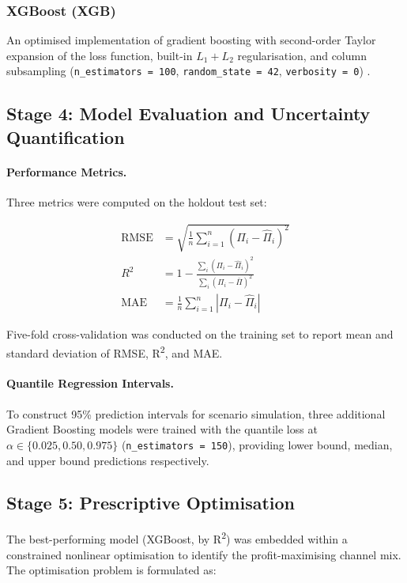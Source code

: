 \documentclass[10pt,a4paper,twocolumn]{article}
\begin{document}
\subsubsection{XGBoost (XGB)}
An optimised implementation of gradient boosting with second-order Taylor expansion of
the loss function, built-in $L_1 + L_2$ regularisation, and column subsampling
(\texttt{n\_estimators = 100}, \texttt{random\_state = 42}, \texttt{verbosity = 0})
\citep{chen2016xgboost}.

\subsection{Stage 4: Model Evaluation and Uncertainty Quantification}
\label{sec:evaluation}

\paragraph{Performance Metrics.}
Three metrics were computed on the holdout test set:

\begin{align}
  \text{RMSE} &= \sqrt{\frac{1}{n}\sum_{i=1}^{n}\left(\Pi_i - \hat{\Pi}_i\right)^2}
  \label{eq:rmse}\\
  R^2 &= 1 - \frac{\sum_{i}(\Pi_i - \hat{\Pi}_i)^2}{\sum_{i}(\Pi_i - \bar{\Pi})^2}
  \label{eq:r2}\\
  \text{MAE} &= \frac{1}{n}\sum_{i=1}^{n}\left|\Pi_i - \hat{\Pi}_i\right|
  \label{eq:mae}
\end{align}

Five-fold cross-validation was conducted on the training set to report mean and
standard deviation of RMSE, R\textsuperscript{2}, and MAE.

\paragraph{Quantile Regression Intervals.}
To construct 95\% prediction intervals for scenario simulation, three additional
Gradient Boosting models were trained with the quantile loss at $\alpha \in
\{0.025, 0.50, 0.975\}$ (\texttt{n\_estimators = 150}), providing lower bound,
median, and upper bound predictions respectively.

\subsection{Stage 5: Prescriptive Optimisation}
\label{sec:optimisation}

The best-performing model (XGBoost, by R\textsuperscript{2}) was embedded within a
constrained nonlinear optimisation to identify the profit-maximising channel mix. The
optimisation problem is formulated as:
\end{document}

